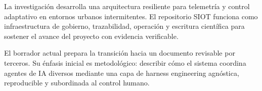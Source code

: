 La investigación desarrolla una arquitectura resiliente para telemetría y control adaptativo en entornos urbanos intermitentes. El repositorio SIOT funciona como infraestructura de gobierno, trazabilidad, operación y escritura científica para sostener el avance del proyecto con evidencia verificable.

El borrador actual prepara la transición hacia un documento revisable por terceros. Su énfasis inicial es metodológico: describir cómo el sistema coordina agentes de IA diversos mediante una capa de harness engineering agnóstica, reproducible y subordinada al control humano.
